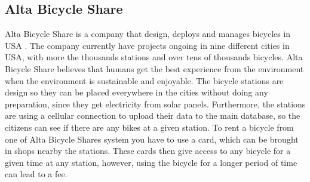 \subsection{Alta Bicycle Share}
Alta Bicycle Share is a company that design, deploys and manages bicycles in USA \citep{misc:AltaBicycleShare}.
The company currently have projects ongoing in nine different cities in USA, with more the thousands stations and over tens of thousands bicycles. 
Alta Bicycle Share believes that humans get the best experience from the environment when the environment is sustainable and enjoyable.
The bicycle stations are design so they can be placed everywhere in the cities without doing any preparation, since they get electricity from solar panels.
Furthermore, the stations are using a cellular connection to upload their data to the main database, so the citizens can see if there are any bikes at a given station.
To rent a bicycle from one of Alta Bicycle Shares system you have to use a card, which can be brought in shops nearby the stations.
These cards then give access to any bicycle for a given time at any station, however, using the bicycle for a longer period of time can lead to a fee.
